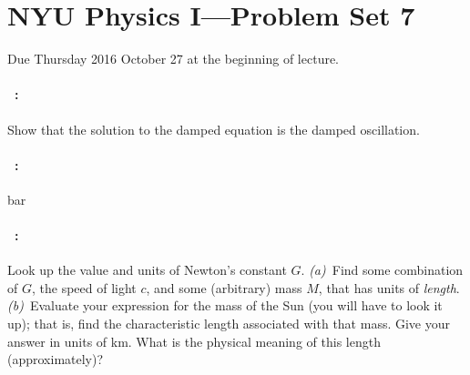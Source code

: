 \documentclass[12pt]{article}
\begin{document}
\section*{NYU Physics I---Problem Set 7}

Due Thursday 2016 October 27 at the beginning of lecture.

\paragraph{\problemname~\theproblem:}%
Show that the solution to the damped equation is the damped oscillation.

\paragraph{\problemname~\theproblem:}%
bar

\paragraph{\problemname~\theproblem:}%
Look up the value and units of Newton's constant $G$.
\textsl{(a)}~Find some combination of $G$, the speed of light $c$, and
some (arbitrary) mass $M$, that has units of \emph{length}.
\textsl{(b)}~Evaluate your expression for the mass of the Sun (you
will have to look it up); that is, find the characteristic length
associated with that mass.  Give your answer in units of km.  What is
the physical meaning of this length (approximately)?
\end{document}
